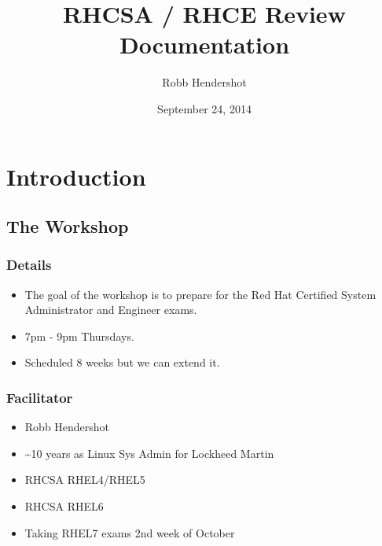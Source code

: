 \documentclass[letterpaper,10pt,english]{sphinxmanual}
\title{RHCSA / RHCE Review Documentation}
\date{September 24, 2014}
\author{Robb Hendershot}
\begin{document}
\maketitle
\tableofcontents
{}\label{index::doc}



\chapter{Introduction}
\label{intro:rhcsa-rhce-review}\label{intro:introduction}\label{intro::doc}

\section{The Workshop}
\label{intro:the-workshop}

\subsection{Details}
\label{intro:details}\begin{itemize}
\item {} 
The goal of the workshop is to prepare for the Red Hat Certified System Administrator and Engineer exams.

\item {} 
7pm - 9pm Thursdays.

\item {} 
Scheduled 8 weeks but we can extend it.

\end{itemize}


\subsection{Facilitator}
\label{intro:facilitator}\begin{itemize}
\item {} 
Robb Hendershot

\item {} 
\textasciitilde{}10 years as Linux Sys Admin for Lockheed Martin

\item {} 
RHCSA RHEL4/RHEL5

\item {} 
RHCSA RHEL6

\item {} 
Taking RHEL7 exams 2nd week of October

\end{itemize}
\end{document}
